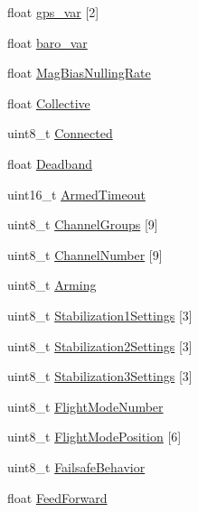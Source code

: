 \begin{DoxyCompactItemize}
\item 
float \hyperlink{struct____attribute_____afe1df5cefaa9919447b3175a9711bd93}{gps\-\_\-var} \mbox{[}2\mbox{]}
\item 
float \hyperlink{struct____attribute_____a5133c37e14f3e4f7ee9779f506dfa6f7}{baro\-\_\-var}
\item 
float \hyperlink{struct____attribute_____ac2135817edec66ff039c7940bc638d2e}{\-Mag\-Bias\-Nulling\-Rate}
\item 
float \hyperlink{struct____attribute_____aba158570e3e3e7c7b0aa4932e9b43b51}{\-Collective}
\item 
uint8\-\_\-t \hyperlink{struct____attribute_____a45a88bd47ca3ee3449a1e0139d399568}{\-Connected}
\item 
float \hyperlink{struct____attribute_____a2471812acbca8164c2a48c59206ee16e}{\-Deadband}
\item 
uint16\-\_\-t \hyperlink{struct____attribute_____a6b5ac915a71f39fe54514fe9b2382227}{\-Armed\-Timeout}
\item 
uint8\-\_\-t \hyperlink{struct____attribute_____ae49af57461bb199c8cbe21ef4dfc07ab}{\-Channel\-Groups} \mbox{[}9\mbox{]}
\item 
uint8\-\_\-t \hyperlink{struct____attribute_____a8dc687e95a7012aecf507c1f8b4ce97d}{\-Channel\-Number} \mbox{[}9\mbox{]}
\item 
uint8\-\_\-t \hyperlink{struct____attribute_____a53a8bb9ad74e2e89065b854a25e52583}{\-Arming}
\item 
uint8\-\_\-t \hyperlink{struct____attribute_____afbdf60f77b39a9ca1bf676e47f80f77a}{\-Stabilization1\-Settings} \mbox{[}3\mbox{]}
\item 
uint8\-\_\-t \hyperlink{struct____attribute_____a9dd594e2e3ae12c5abf6dc7c142456e4}{\-Stabilization2\-Settings} \mbox{[}3\mbox{]}
\item 
uint8\-\_\-t \hyperlink{struct____attribute_____a99adb7bc6e9224f6882e354533589805}{\-Stabilization3\-Settings} \mbox{[}3\mbox{]}
\item 
uint8\-\_\-t \hyperlink{struct____attribute_____a7ed2a001e08fda9e3fe9ab76c5d3bd3a}{\-Flight\-Mode\-Number}
\item 
uint8\-\_\-t \hyperlink{struct____attribute_____a3cfbb5d5e331ecaefa5d759628fc1aba}{\-Flight\-Mode\-Position} \mbox{[}6\mbox{]}
\item 
uint8\-\_\-t \hyperlink{struct____attribute_____a12df0702c4655870a1c4edaeb4b46731}{\-Failsafe\-Behavior}
\item 
float \hyperlink{struct____attribute_____a7d242f0509d2eb2865606d6c9d49e10d}{\-Feed\-Forward}

\end{DoxyCompactItemize}
